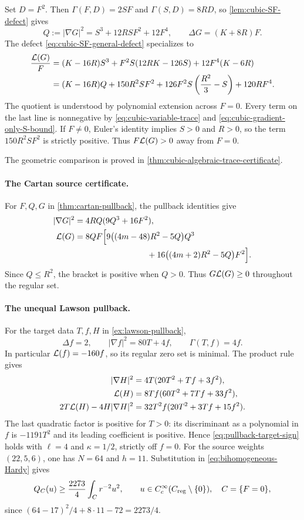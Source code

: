 Set \(D=F^2\). Then
\(\Gamma(F,D)=2SF\) and \(\Gamma(S,D)=8RD\), so
\cref{lem:cubic-SF-defect} gives
\begin{equation}\label{eq:cubic-variable-trace-gradient}
 Q:=|\nabla G|^2=S^3+12RSF^2+12F^4,
 \qquad \Delta G=(K+8R)F.
\end{equation}
The defect \eqref{eq:cubic-SF-general-defect} specializes to
\begin{align}
 \frac{\mathcal L(G)}F
 &=(K-16R)S^3+F^2S(12RK-126S)
                       +12F^4(K-6R)\nonumber\\
 &=(K-16R)Q+150R^2SF^2
       +126F^2S\left(\frac{R^2}3-S\right)+120RF^4.
 \label{eq:cubic-variable-trace-positive-decomposition}
\end{align}
The quotient is understood by polynomial extension across $F=0$.
Every term on the last line is nonnegative by
\eqref{eq:cubic-variable-trace} and
\eqref{eq:cubic-gradient-only-S-bound}. If $F\ne0$, Euler's
identity implies $S>0$ and $R>0$, so the term $150R^2SF^2$
is strictly positive. Thus $F\mathcal L(G)>0$ away from $F=0$.

The geometric comparison is proved in
\cref{thm:cubic-algebraic-trace-certificate}.


\paragraph{The Cartan source certificate.}

For \(F,Q,G\) in \cref{thm:cartan-pullback}, the pullback identities give
\begin{align}
 |\nabla G|^2&=4RQ(9Q^3+16F^2),
 \label{eq:Cartan-pullback-gradient}\\
 \cL(G)&=8QF\Bigl[
 9\bigl((4m-48)R^2-5Q\bigr)Q^3\notag\\
 &\hspace{31mm}
 +16\bigl((4m+2)R^2-5Q\bigr)F^2\Bigr].
 \label{eq:Cartan-pullback-defect}
\end{align}
Since \(Q\leq R^2\), the bracket is positive when \(Q>0\).
Thus \(G\mathcal L(G)\geq0\) throughout the regular set.

\paragraph{The unequal Lawson pullback.}
For the target data $T,f,H$ in \cref{ex:lawson-pullback},
\[
 \Delta f=2,\qquad |\nabla f|^2=80T+4f,\qquad
 \Gamma(T,f)=4f.
\]
In particular $\mathcal L(f)=-160f$, so its regular zero set is minimal.
The product rule gives
\begin{align*}
 |\nabla H|^2&=4T(20T^2+Tf+3f^2),\\
 \mathcal L(H)&=8Tf(60T^2+7Tf+33f^2),\\
 2T\mathcal L(H)-4H|\nabla H|^2
 &=32T^2f(20T^2+3Tf+15f^2).
\end{align*}
The last quadratic factor is positive for $T>0$: its discriminant
as a polynomial in $f$ is $-1191T^2$ and its leading coefficient
is positive. Hence \eqref{eq:pullback-target-sign} holds with
$\ell=4$ and $\kappa=1/2$, strictly off $f=0$.
For the source weights $(22,5,6)$, one has $N=64$ and $h=11$.
Substitution in \eqref{eq:bihomogeneous-Hardy} gives
\[
 Q_C(u)\geq\frac{2273}{4}\int_Cr^{-2}u^2,
 \qquad u\in C_c^\infty(C_{\mathrm{reg}}\setminus\{0\}),
 \quad C=\{F=0\},
\]
since $(64-17)^2/4+8\cdot11-72=2273/4$.
